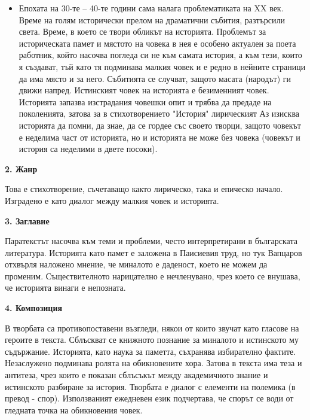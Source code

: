 \documentclass[12pt,a4paper]{article}
\begin{document}
\begin{itemize}[leftmargin=*]
\vspace{-0.45cm}
\item Епохата на 30-те – 40-те години сама налага проблематиката на XX век. Време на голям исторически прелом на драматични събития, разтърсили света. Време, в което се твори обликът на историята. Проблемът за историческата памет и мястото на човека в нея е особено актуален за поета работник, който насочва погледа си не към самата история, а към тези, които я създават, тъй като тя подминава малкия човек и е редно в нейните страници да има място и за него. Събитията се случват, защото масата (народът) ги движи напред. Истинският човек на историята е безименният човек. Историята запазва изстрадания човешки опит и трябва да предаде на поколенията, затова за в стихотворението "История" лирическият Аз изисква историята да помни, да знае, да се гордее със своето творци, защото човекът е неделима част от историята, но и историята не може без човека (човекът и история са неделими в двете посоки).
\end{itemize}

\vspace{0.1cm}
 
\textbf{2. Жанр}
\vspace{0.1cm}
 
\indent Това е стихотворение, съчетаващо както лирическо, така и епическо начало. Изградено е като диалог между малкия човек и историята.

\vspace{0.1cm}
 
\textbf{3. Заглавие}
\vspace{0.1cm}

\indent Паратекстът насочва към теми и проблеми, често интерпретирани в българската литература. Историята като памет е заложена в Паисиевия труд, но тук Вапцаров отхвърля наложено мнение, че миналото е даденост, което не можем да променим. Съществителното нарицателно е нечленувано, чрез което се внушава, че историята винаги е непозната.

\vspace{0.1cm}
 
\textbf{4. Композиция}
\vspace{0.1cm}

\indent В творбата са противопоставени възгледи, някои от които звучат като гласове на героите в текста. Сблъскват се книжното познание за миналото и истинското му съдържание. Историята, като наука за паметта, \colorbox{yellow!40}{съхранява избирателно фактите}. Незаслужено подминава ролята на обикновените хора. Затова в текста има теза и антитеза, чрез които е показан сблъсъкът между академичното знание и истинското разбиране за история. Творбата е диалог с елементи на полемика (в превод - спор). Използваният ежедневен език подчертава, че спорът се води от гледната точка на обикновения човек.
\end{document}

